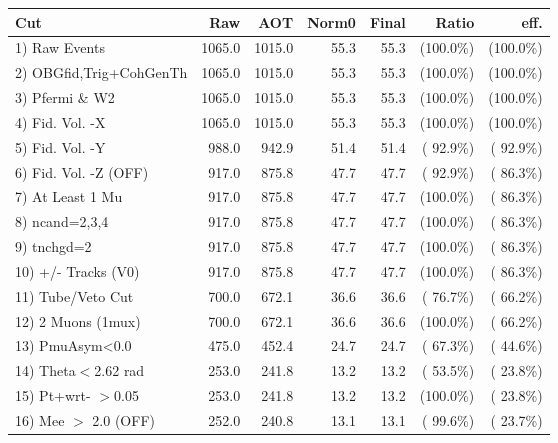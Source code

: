  \begin{table}[h!]\centering
 \begin{tabular}{||l||r|r|r|r|r|r||}
 \hline
 \hline
 Cut & Raw & AOT & Norm0 & Final & Ratio & eff.       \\
 \hline
  1) Raw Events           &       1065.0 &       1015.0 &         55.3 &         55.3 & (100.0\%) & (100.0\%) \\
  2) OBGfid,Trig+CohGenTh &       1065.0 &       1015.0 &         55.3 &         55.3 & (100.0\%) & (100.0\%) \\
  3) Pfermi \& W2         &       1065.0 &       1015.0 &         55.3 &         55.3 & (100.0\%) & (100.0\%) \\
  4) Fid. Vol. -X         &       1065.0 &       1015.0 &         55.3 &         55.3 & (100.0\%) & (100.0\%) \\
  5) Fid. Vol. -Y         &        988.0 &        942.9 &         51.4 &         51.4 & ( 92.9\%) & ( 92.9\%) \\
  6) Fid. Vol. -Z (OFF)   &        917.0 &        875.8 &         47.7 &         47.7 & ( 92.9\%) & ( 86.3\%) \\
  7) At Least 1 Mu        &        917.0 &        875.8 &         47.7 &         47.7 & (100.0\%) & ( 86.3\%) \\
  8) ncand=2,3,4          &        917.0 &        875.8 &         47.7 &         47.7 & (100.0\%) & ( 86.3\%) \\
  9) tnchgd=2             &        917.0 &        875.8 &         47.7 &         47.7 & (100.0\%) & ( 86.3\%) \\
 10) +/- Tracks (V0)      &        917.0 &        875.8 &         47.7 &         47.7 & (100.0\%) & ( 86.3\%) \\
 11) Tube/Veto Cut        &        700.0 &        672.1 &         36.6 &         36.6 & ( 76.7\%) & ( 66.2\%) \\
 12) 2 Muons (1mux)       &        700.0 &        672.1 &         36.6 &         36.6 & (100.0\%) & ( 66.2\%) \\
 13) PmuAsym<0.0          &        475.0 &        452.4 &         24.7 &         24.7 & ( 67.3\%) & ( 44.6\%) \\
 14) Theta$<$2.62 rad     &        253.0 &        241.8 &         13.2 &         13.2 & ( 53.5\%) & ( 23.8\%) \\
 15) Pt+wrt- $>$0.05      &        253.0 &        241.8 &         13.2 &         13.2 & (100.0\%) & ( 23.8\%) \\
 16) Mee $>$ 2.0  (OFF)   &        252.0 &        240.8 &         13.1 &         13.1 & ( 99.6\%) & ( 23.7\%) \\

\end{tabular}
\end{table}
